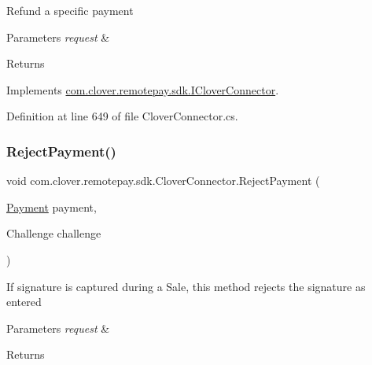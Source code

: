 Refund a specific payment 


\begin{DoxyParams}{Parameters}
{\em request} & \\
\hline
\end{DoxyParams}
\begin{DoxyReturn}{Returns}

\end{DoxyReturn}


Implements \hyperlink{interfacecom_1_1clover_1_1remotepay_1_1sdk_1_1_i_clover_connector_aaa44684c7bf2c04b88ead61034c7c273}{com.\+clover.\+remotepay.\+sdk.\+I\+Clover\+Connector}.



Definition at line 649 of file Clover\+Connector.\+cs.

\mbox{\label{classcom_1_1clover_1_1remotepay_1_1sdk_1_1_clover_connector_a2ffc66f46fddbf37d780ca269dd3b562}} 
\subsubsection{\texorpdfstring{Reject\+Payment()}{RejectPayment()}}
{\footnotesize\ttfamily void com.\+clover.\+remotepay.\+sdk.\+Clover\+Connector.\+Reject\+Payment (\begin{DoxyParamCaption}\item[{\hyperlink{classcom_1_1clover_1_1sdk_1_1v3_1_1payments_1_1_payment}{Payment}}]{payment,  }\item[{Challenge}]{challenge }\end{DoxyParamCaption})}



If signature is captured during a Sale, this method rejects the signature as entered 


\begin{DoxyParams}{Parameters}
{\em request} & \\
\hline
\end{DoxyParams}
\begin{DoxyReturn}{Returns}

\end{DoxyReturn}


